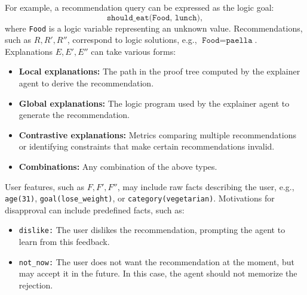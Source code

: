 For example, a recommendation query can be expressed as the logic goal:
%
\[
\texttt{should\_eat(Food, lunch)},
\]
%
where \texttt{Food} is a logic variable representing an unknown value.
%
Recommendations, such as \( R, R', R'' \), correspond to logic solutions, e.g., \(\texttt{Food} = \texttt{paella}\).
%
Explanations \( E, E', E'' \) can take various forms:
%
\begin{itemize}
    \item \textbf{Local explanations:} The path in the proof tree computed by the explainer agent to derive the recommendation.
    \item \textbf{Global explanations:} The logic program used by the explainer agent to generate the recommendation.
    \item \textbf{Contrastive explanations:} Metrics comparing multiple recommendations or identifying constraints that make certain recommendations invalid.
    \item \textbf{Combinations:} Any combination of the above types.
\end{itemize}

User features, such as \( F, F', F'' \), may include raw facts describing the user, e.g., \texttt{age(31)}, \texttt{goal(lose\_weight)}, or \texttt{category(vegetarian)}.
%
Motivations for disapproval can include predefined facts, such as:
%
\begin{itemize}
    \item \texttt{dislike:} The user dislikes the recommendation, prompting the agent to learn from this feedback.
    \item \texttt{not\_now:} The user does not want the recommendation at the moment, but may accept it in the future. In this case, the agent should not memorize the rejection.
\end{itemize}


